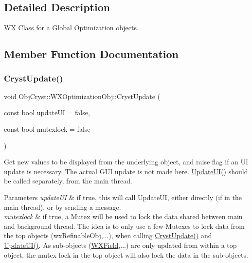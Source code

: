 \subsection{Detailed Description}
WX Class for a Global Optimization objects. 

\subsection{Member Function Documentation}
\mbox{\label{class_obj_cryst_1_1_w_x_optimization_obj_a742684b478a21cec25a74c2b39914d80}} 
\subsubsection{\texorpdfstring{CrystUpdate()}{CrystUpdate()}}
{\footnotesize\ttfamily void Obj\+Cryst\+::\+W\+X\+Optimization\+Obj\+::\+Cryst\+Update (\begin{DoxyParamCaption}\item[{const bool}]{update\+UI = {\ttfamily false},  }\item[{const bool}]{mutexlock = {\ttfamily false} }\end{DoxyParamCaption})\hspace{0.3cm}{\ttfamily [virtual]}}

Get new values to be displayed from the underlying object, and raise flag if an UI update is necessary. The actual G\+UI update is not made here. \mbox{\hyperlink{class_obj_cryst_1_1_w_x_optimization_obj_a4643e15059bdd46e65c0ac18d7491787}{Update\+U\+I()}} should be called separately, from the main thread.


\begin{DoxyParams}{Parameters}
{\em update\+UI} & if true, this will call Update\+UI, either directly (if in the main thread), or by sending a message. \\
\hline
{\em mutexlock} & if true, a Mutex will be used to lock the data shared between main and background thread. The idea is to only use a few Mutexes to lock data from the top objects (wx\+Refinable\+Obj,...), when calling \mbox{\hyperlink{class_obj_cryst_1_1_w_x_optimization_obj_a742684b478a21cec25a74c2b39914d80}{Cryst\+Update()}} and \mbox{\hyperlink{class_obj_cryst_1_1_w_x_optimization_obj_a4643e15059bdd46e65c0ac18d7491787}{Update\+U\+I()}}. As sub-\/objects (\mbox{\hyperlink{class_obj_cryst_1_1_w_x_field}{W\+X\+Field}},...) are only updated from within a top object, the mutex lock in the top object will also lock the data in the sub-\/objects. \\
\hline
\end{DoxyParams}


